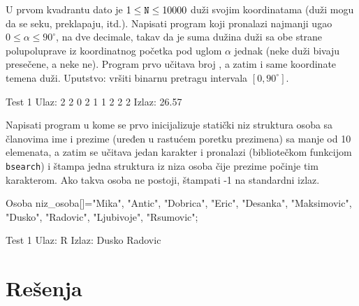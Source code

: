 \begin{Exercise}[label=409]
  U prvom kvadrantu dato je $1 \leq \texttt{N} \leq 10000$ duži svojim
  koordinatama (duži mogu da se seku, preklapaju, itd.). Napisati
  program koji pronalazi najmanji ugao $0 \leq \alpha \leq 90^\circ$,
  na dve decimale, takav da je suma dužina duži sa obe strane
  polupoluprave iz koordinatnog početka pod uglom $\alpha$ jednak
  (neke duži bivaju presečene, a neke ne). Program prvo učitava broj
  , a zatim i same koordinate temena duži. Uputstvo: vršiti
  binarnu pretragu intervala $[0, 90^\circ]$.
  
\begin{minitest}
\begin{test}{Test 1}
Ulaz:
2
2 0 2 1
1 2 2 2
Izlaz:
26.57 
\end{test}
\end{minitest}
  
\end{Exercise}

\begin{Exercise}[label=410]
  Napisati program u kome se prvo inicijalizuje statički niz struktura
  osoba sa članovima ime i prezime (uređen u rastućem poretku
  prezimena) sa manje od 10 elemenata, a zatim se učitava jedan
  karakter i pronalazi (bibliotečkom funkcijom \verb|bsearch|) i
  štampa jedna struktura iz niza osoba čije prezime počinje tim
  karakterom. Ako takva osoba ne postoji, štampati -1 na standardni
  izlaz.
\begin{ckod}
Osoba niz_osoba[]={{"Mika", "Antic"},
                   {"Dobrica", "Eric"},
                   {"Desanka", "Maksimovic"},
                   {"Dusko", "Radovic"},
                   {"Ljubivoje", "Rsumovic"}};
\end{ckod}
  
\begin{minitest}
\begin{test}{Test 1}
Ulaz:  R
Izlaz: Dusko Radovic
\end{test}
\end{minitest}
  
\end{Exercise}


\section{Rešenja}

\shipoutAnswer


